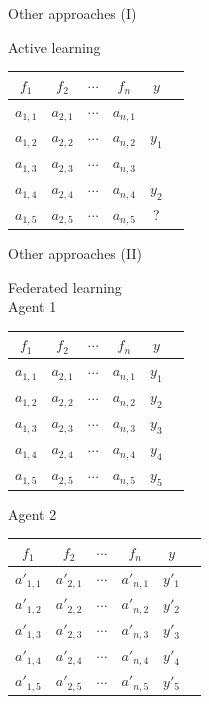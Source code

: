 \documentclass[10pt,compress]{beamer} %
\begin{document}
\begin{frame}[fragile]{Other approaches (I)}
\begin{center}
	    \begin{center}
        \centering Active learning\\
    	\begin{tabular}{cccccc}\hline
    	 	$f_1$     & $f_2$     & $\cdots$ & $f_n$     & $y$\\\hline
    	 	$a_{1,1}$ & $a_{2,1}$ & $\cdots$ & $a_{n,1}$ &  \\
    	 	$a_{1,2}$ & $a_{2,2}$ & $\cdots$ & $a_{n,2}$ & $y_1$ \\
    	 	$a_{1,3}$ & $a_{2,3}$ & $\cdots$ & $a_{n,3}$ &  \\
    	 	$a_{1,4}$ & $a_{2,4}$ & $\cdots$ & $a_{n,4}$ & $y_2$ \\
    	 	$a_{1,5}$ & $a_{2,5}$ & $\cdots$ & $a_{n,5}$ & ?\\
    	 	\hline
    	\end{tabular}
    	\end{center}
    \end{center}
\end{frame}

\begin{frame}[fragile]{Other approaches (II)}
    \begin{center}
        Federated learning\\

        Agent 1
    	\begin{tabular}{cccccc}\hline
    	 	$f_1$     & $f_2$     & $\cdots$ & $f_n$     & $y$\\\hline
    	 	$a_{1,1}$ & $a_{2,1}$ & $\cdots$ & $a_{n,1}$ & $y_1$ \\
    	 	$a_{1,2}$ & $a_{2,2}$ & $\cdots$ & $a_{n,2}$ & $y_2$ \\
    	 	$a_{1,3}$ & $a_{2,3}$ & $\cdots$ & $a_{n,3}$ & $y_3$ \\
    	 	$a_{1,4}$ & $a_{2,4}$ & $\cdots$ & $a_{n,4}$ & $y_4$ \\
    	 	$a_{1,5}$ & $a_{2,5}$ & $\cdots$ & $a_{n,5}$ & $y_5$ \\
    	 	\hline
    	\end{tabular}

        Agent 2
    	\begin{tabular}{cccccc}\hline
    	 	$f_1$     & $f_2$     & $\cdots$ & $f_n$     & $y$\\\hline
    	 	$a'_{1,1}$ & $a'_{2,1}$ & $\cdots$ & $a'_{n,1}$ & $y'_1$ \\
    	 	$a'_{1,2}$ & $a'_{2,2}$ & $\cdots$ & $a'_{n,2}$ & $y'_2$ \\
    	 	$a'_{1,3}$ & $a'_{2,3}$ & $\cdots$ & $a'_{n,3}$ & $y'_3$ \\
    	 	$a'_{1,4}$ & $a'_{2,4}$ & $\cdots$ & $a'_{n,4}$ & $y'_4$ \\
    	 	$a'_{1,5}$ & $a'_{2,5}$ & $\cdots$ & $a'_{n,5}$ & $y'_5$ \\
    	 	\hline
    	\end{tabular}
 	\end{center}
\end{frame}
\end{document}
